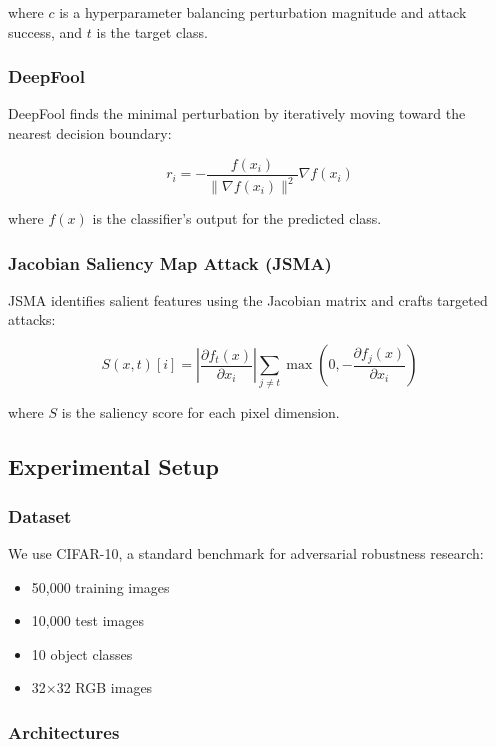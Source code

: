 \documentclass[10pt,conference]{IEEEtran}
\begin{document}
where $c$ is a hyperparameter balancing perturbation magnitude and attack success, and $t$ is the target class.

\subsubsection{DeepFool}

DeepFool finds the minimal perturbation by iteratively moving toward the nearest decision boundary:

\begin{equation}
r_i = -\frac{f(x_i)}{\|\nabla f(x_i)\|^2} \nabla f(x_i)
\end{equation}

where $f(x)$ is the classifier's output for the predicted class.

\subsubsection{Jacobian Saliency Map Attack (JSMA)}

JSMA identifies salient features using the Jacobian matrix and crafts targeted attacks:

\begin{equation}
S(x, t)[i] = |\frac{\partial f_t(x)}{\partial x_i}| \sum_{j \neq t} \max(0, -\frac{\partial f_j(x)}{\partial x_i})
\end{equation}

where $S$ is the saliency score for each pixel dimension.

\subsection{Experimental Setup}

\subsubsection{Dataset}

We use CIFAR-10, a standard benchmark for adversarial robustness research:
\begin{itemize}
    \item 50,000 training images
    \item 10,000 test images
    \item 10 object classes
    \item 32×32 RGB images
\end{itemize}

\subsubsection{Architectures}
\end{document}
